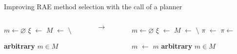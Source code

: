 \begin{frame}[fragile]{Improving RAE method selection with the call of a planner}
    \begin{columns}[c]
        \begin{column}{0.4\textwidth}
            \begin{algorithm}[H]
                \begin{algorithmic}
                    \scriptsize
                    \State $m \gets \varnothing$
                    \State $\xi$ $\gets$ 
                    \State $M$ $\gets$  $\setminus$ 
                    
                    \State \Return \textbf{arbitrary} $m \in M$ \label{line:return-failure}
                    
                    \EndFunction
              
                \end{algorithmic}
                \caption{Greedy select for a task $\tau$.}
                \label{alg:plan}
              \end{algorithm}
        \end{column}
        \begin{column}[c]{0.1\textwidth}
            \centering
            $\rightarrow$
        \end{column}
        
        \begin{column}{0.5\textwidth}
            
            \begin{algorithm}[H]
                \begin{algorithmic}
                    \scriptsize
                    \State $m \gets \varnothing$
                    \State $\xi$ $\gets$ 
                    \State $M$ $\gets$  $\setminus$ 
                    \State $\pi$ $\gets$  \label{line:get-parent-plan}
                     \label{line:check-valid}
                      \State $\pi \gets$  \label{line:call-planner}
                      
                    \EndIf
                    \State $m$ $\gets$  \label{line:get-method}
                      \State \Return $m$ \label{line:return-success}
                    \Else
                      \State \Return \textbf{arbitrary} $m \in M$ \label{line:return-failure}
                    \EndIf
                    \EndFunction
              

\end{algorithmic}
\end{algorithm}
\end{column}
\end{columns}
\end{frame}
